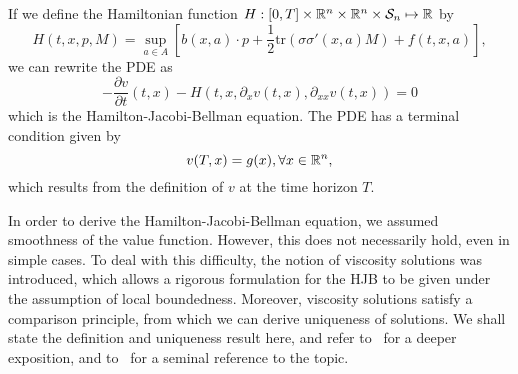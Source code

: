 If we define the Hamiltonian function $H : [0,T] \times \mathbb{R}^n \times \mathbb{R}^n \times \mathcal{S}_n \mapsto \mathbb{R}$
by
\begin{equation}
    H(t,x,p,M) = \sup_{a \in A} \left[ b(x,a)\cdot p + \frac{1}{2} \text{tr} (\sigma \sigma' (x,a) M) + f(t,x,a) \right],
\end{equation}
we can rewrite the PDE as
\begin{equation}\label{soc:hjb_equation}
    -\frac{ \partial v}{\partial t} (t,x) - H(t,x,\partial_x v(t,x), \partial_{xx} v(t,x)) = 0
\end{equation}
which is the Hamilton-Jacobi-Bellman equation.
The PDE has a terminal condition given by
\begin{equation}
    v(T,x) = g(x), \forall x \in \mathbb{R}^n,
\end{equation}
which results from the definition of $v$ at the time horizon $T$.

In order to derive the Hamilton-Jacobi-Bellman equation, we assumed smoothness
of the value function. However, this does not necessarily hold, even in simple
cases. To deal with this difficulty, the notion of viscosity solutions was 
introduced, which allows a rigorous formulation for the HJB to be given under
the assumption of local boundedness. Moreover, viscosity solutions satisfy a 
comparison principle, from which we can derive uniqueness of solutions.
We shall state the definition and uniqueness result here, and
 refer to~\cite{pham2009continuous,bressan2007introduction,lopes1997introduccao} for a deeper exposition, 
 and to~\cite{crandall1992user} for a seminal reference to the topic.

